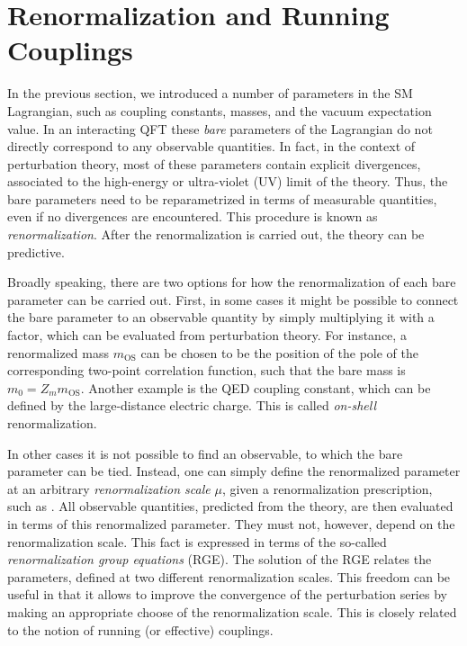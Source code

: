 \section{Renormalization and Running Couplings}
\label{Renormalization}
\label{sec:runcoup}


In the previous section, we introduced a number of parameters in the SM Lagrangian, such as coupling constants, masses, and the vacuum expectation value.
In an interacting QFT these \emph{bare} parameters of the Lagrangian do not directly correspond to any observable quantities.
In fact, in the context of perturbation theory, most of these parameters contain explicit divergences,
associated to the high-energy or ultra-violet (UV) limit of the theory.
Thus, the bare parameters need to be reparametrized in terms of measurable quantities,
even if no divergences are encountered.
This procedure is known as \emph{renormalization}.
After the renormalization is carried out, the theory can be predictive.

Broadly speaking, there are two options for how the renormalization of each bare parameter can be carried out.
First, in some cases it might be possible to connect the bare parameter to an observable quantity by simply multiplying it with a factor, which can be evaluated from perturbation theory.
For instance, a renormalized mass $m_\text{OS}$ can be chosen to be the position of the pole of the corresponding two-point correlation function,
such that the bare mass is 
$
  m_0 = Z_m m_\text{OS}.
$
Another example is the QED coupling constant, which can be defined by the large-distance electric charge.
This is called \emph{on-shell} renormalization.

In other cases it is not possible to find an observable, to which the bare parameter can be tied.
Instead, one can simply define the renormalized parameter at an arbitrary \emph{renormalization scale} $\mu$, given a renormalization prescription, such as \MSbar.
All observable quantities, predicted from the theory, are then evaluated in terms of this renormalized parameter.
They must not, however, depend on the renormalization scale.
This fact is expressed in terms of the so-called \emph{renormalization group equations} (RGE).
The solution of the RGE relates the parameters, defined at two different renormalization scales.
This freedom can be useful in that it allows to improve the convergence of the perturbation series
by making an appropriate choose of the renormalization scale.
This is closely related to the notion of running (or effective) couplings.

